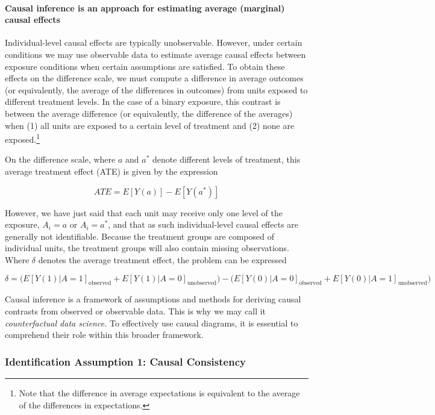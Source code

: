 \documentclass[
  singlecolumn]{article}
\let\oldparagraph\paragraph
\renewcommand{\paragraph}[1]{\oldparagraph{#1}\mbox{}}
\begin{document}
\hypertarget{causal-inference-is-an-approach-for-estimating-average-marginal-causal-effects}{%
\paragraph{Causal inference is an approach for estimating average
(marginal) causal
effects}\label{causal-inference-is-an-approach-for-estimating-average-marginal-causal-effects}}

Individual-level causal effects are typically unobservable. However,
under certain conditions we may use observable data to estimate average
causal effects between exposure conditions when certain assumptions are
satisfied. To obtain these effects on the difference scale, we must
compute a difference in average outcomes (or equivalently, the average
of the differences in outcomes) from units exposed to different
treatment levels. In the case of a binary exposure, this contrast is
between the average difference (or equivalently, the difference of the
averages) when (1) all units are exposed to a certain level of treatment
and (2) none are exposed.\footnote{Note that the difference in average
  expectations is equivalent to the average of the differences in
  expectations.}

On the difference scale, where \(a\) and \(a^*\) denote different levels
of treatment, this average treatment effect (ATE) is given by the
expression

\[
ATE = E[Y(a)] - E[Y(a^*)]
\]

However, we have just said that each unit may receive only one level of
the exposure, \(A_i = a\) or \(A_i = a^*\), and that as such
individual-level causal effects are generally not identifiable. Because
the treatment groups are composed of individual units, the treatment
groups will also contain missing observations. Where \(\delta\) denotes
the average treatment effect, the problem can be expressed

\[
\delta = \bigg(E[Y(1)|A = 1]_{\text{observed}} + E[Y(1)|A = 0]_{\text{unobserved}}\bigg) - \bigg(E[Y(0)|A = 0]_{\text{observed}}  + E[Y(0)|A = 1]_{\text{unobserved}}\bigg)
\]

Causal inference is a framework of assumptions and methods for deriving
causal contrasts from observed or observable data. This is why we may
call it \emph{counterfactual data science.} To effectively use causal
diagrams, it is essential to comprehend their role within this broader
framework.

\hypertarget{identification-assumption-1-causal-consistency}{%
\subsubsection{Identification Assumption 1: Causal
Consistency}\label{identification-assumption-1-causal-consistency}}
\end{document}
